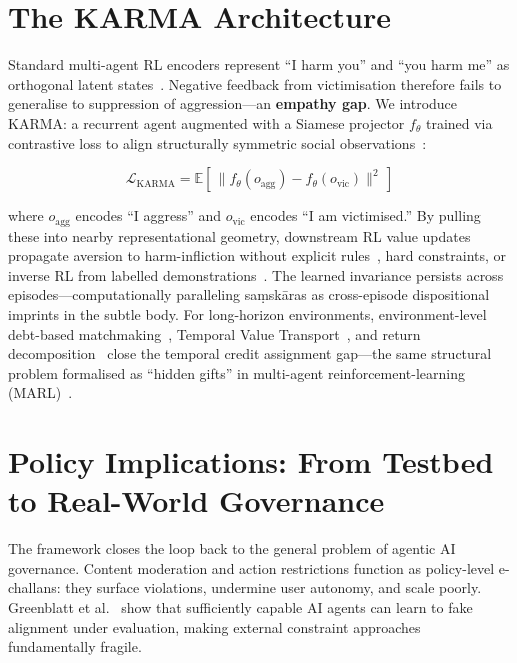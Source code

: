 \documentclass[runningheads]{llncs}
\begin{document}
\section{The KARMA Architecture}

Standard multi-agent RL encoders represent ``I harm you'' and ``you harm me''
as orthogonal latent states~\cite{hausknecht15}. Negative feedback from
victimisation therefore fails to generalise to suppression of aggression---an
\textbf{empathy gap}. We introduce KARMA: a recurrent agent augmented with a
Siamese projector $f_\theta$ trained via contrastive loss to align structurally
symmetric social observations~\cite{chen20,he20}:

\begin{equation}
    \mathcal{L}_{\text{KARMA}}
    = \mathbb{E}\!\left[\,\|f_\theta(o_{\text{agg}})
      - f_\theta(o_{\text{vic}})\|^2\,\right]
    \label{eq:karma}
\end{equation}

where $o_{\text{agg}}$ encodes ``I aggress'' and $o_{\text{vic}}$ encodes ``I
am victimised.'' By pulling these into nearby representational geometry,
downstream RL value updates propagate aversion to harm-infliction without
explicit rules~\cite{neufeld22}, hard constraints, or inverse RL from labelled
demonstrations~\cite{hadfield16}. The learned invariance persists across
episodes---computationally paralleling sa\d{m}sk\={a}ras as cross-episode
dispositional imprints in the subtle body. For long-horizon environments,
environment-level debt-based matchmaking~\cite{rath25}, Temporal Value
Transport~\cite{hung19}, and return decomposition~\cite{arjona19} close the
temporal credit assignment gap---the same structural problem formalised as
``hidden gifts'' in multi-agent reinforcement-learning (MARL)~\cite{malenfant25}.

\section{Policy Implications: From Testbed to Real-World Governance}

The framework closes the loop back to the general problem of agentic AI
governance. Content moderation and action restrictions function as policy-level
e-challans: they surface violations, undermine user autonomy, and scale poorly.
Greenblatt et al.~\cite{greenblatt24} show that sufficiently capable AI agents
can learn to fake alignment under evaluation, making external constraint
approaches fundamentally fragile.
\end{document}
